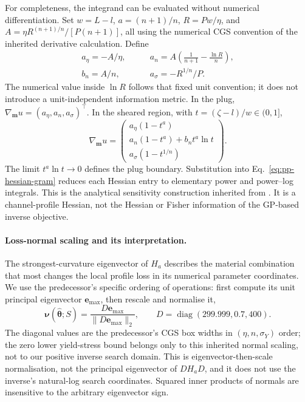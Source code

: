 For completeness, the integrand can be evaluated without numerical
differentiation. Set $w=L-l$, $a=(n+1)/n$,
$R=P w/\eta$, and $A=\eta R^{(n+1)/n}/[P(n+1)]$, all using the
numerical CGS convention of the inherited derivative calculation. Define
\[
\begin{aligned}
 a_\eta=-A/\eta,\qquad
 &a_n=A\!\left(\frac{1}{n+1}-\frac{\ln R}{n}\right),\\
 b_n=A/n,\qquad &a_\sigma=-R^{1/n}/P.
\end{aligned}
\]
The numerical value inside $\ln R$ follows that fixed unit convention;
it does not introduce a unit-independent information metric.
In the plug, $\nabla_{\mathbf m}u=(a_\eta,a_n,a_\sigma)^\top$.
In the sheared region, with $t=(\zeta-l)/w\in(0,1]$,
\[
 \nabla_{\mathbf m}u=
 \begin{pmatrix}
  a_\eta(1-t^a)\\
  a_n(1-t^a)+b_n t^a\ln t\\
  a_\sigma(1-t^{1/n})
 \end{pmatrix}.
\]
The limit $t^a\ln t\to0$ defines the plug boundary. Substitution into
Eq.~\eqref{eq:pp-hessian-gram} reduces each Hessian entry to elementary
power and power--log integrals. This is the analytical sensitivity
construction inherited from \citet[Sec.~5.4]{hamamichi2023nonnewtonian}.
It is a channel-profile Hessian, not the Hessian or Fisher information
of the GP-based inverse objective.

\paragraph{Loss-normal scaling and its interpretation.}
The strongest-curvature eigenvector of $H_a$ describes the material
combination that most changes the local profile loss in its numerical
parameter coordinates. We use the predecessor's specific ordering of
operations: first compute its unit principal eigenvector
$\mathbf e_{\max}$, then rescale and normalise it,
\begin{equation}
\label{eq:hessian-normal}
 \boldsymbol\nu(\widehat{\boldsymbol\theta};S)
 =\frac{D\mathbf e_{\max}}{\|D\mathbf e_{\max}\|_2},\qquad
 D=\operatorname{diag}(299.999,0.7,400).
\end{equation}
The diagonal values are the predecessor's CGS box widths in
$(\eta,n,\sigma_Y)$ order; the zero lower yield-stress bound belongs
only to this inherited normal scaling, not to our positive inverse
search domain. This is eigenvector-then-scale normalisation, not the
principal eigenvector of $D H_a D$, and it does not use the inverse's
natural-log search coordinates. Squared inner products of normals
are insensitive to the arbitrary eigenvector sign.

